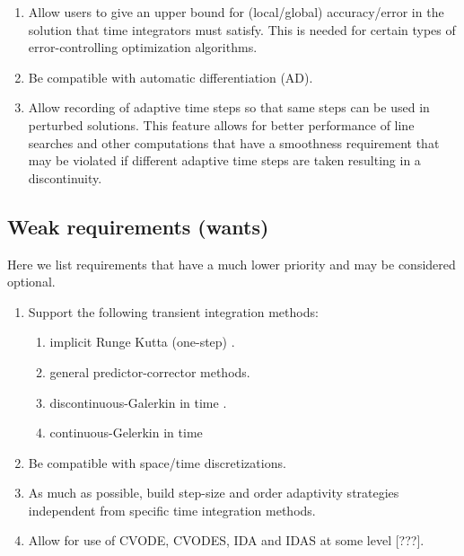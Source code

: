 \documentclass[pdf,ps2pdf,11pt]{SANDreport}
\begin{document}
\begin{enumerate}
{}\item Allow users to give an upper bound for (local/global) accuracy/error
in the solution that time integrators must satisfy.  This is needed for
certain types of error-controlling optimization algorithms.

{}\item Be compatible with automatic differentiation (AD).

{}\item Allow recording of adaptive time steps so that same steps can be used
in perturbed solutions.  This feature allows for better performance of line
searches and other computations that have a smoothness requirement that may be
violated if different adaptive time steps are taken resulting in a
discontinuity.

\end{enumerate}

\subsection{Weak requirements (wants)}

Here we list requirements that have a much lower priority and may be
considered optional.

\begin{enumerate}

{}\item Support the following transient integration methods:
  \begin{enumerate}
  {}\item implicit Runge Kutta (one-step) \cite{IRKMethods}.
  {}\item general predictor-corrector methods.
  {}\item discontinuous-Galerkin in time \cite{DGTime}.
  {}\item continuous-Gelerkin in time \cite{CGTime}
  \end{enumerate}

{}\item Be compatible with space/time discretizations.

{}\item As much as possible, build step-size and order adaptivity strategies
independent from specific time integration methods.

{}\item Allow for use of CVODE, CVODES, IDA and IDAS at some level [???].

\end{enumerate}
\end{document}
